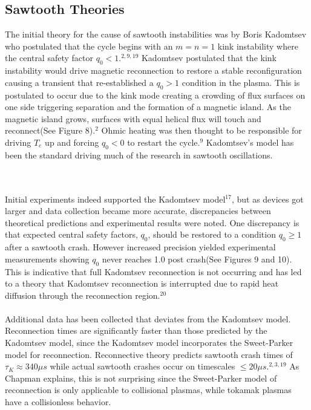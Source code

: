 \documentclass{article}
\begin{document}
\subsection{Sawtooth Theories}
The initial theory for the cause of sawtooth instabilities was by Boris Kadomtsev who postulated that the cycle begins with an $m=n=1$ kink instability where the central safety factor $q_0<1$.$^{2,9,19}$  Kadomtsev postulated that the kink instability would drive magnetic reconnection to restore a stable reconfiguration causing a transient that re-established a $q_0>1$ condition in the plasma.  This is postulated to occur due to the kink mode creating a crowding of flux surfaces on one side triggering separation and the formation of a magnetic island.  As the magnetic island grows, surfaces with equal helical flux will touch and reconnect(See Figure 8).$^{2}$  Ohmic heating was then thought to be responsible for driving $T_e$ up and forcing $q_0<0$ to restart the cycle.$^{9}$  Kadomtsev's model has been the standard driving much of the research in sawtooth oscillations.
\begin{SCfigure}
\centering
{}
\end{SCfigure}
\\\\Initial experiments indeed supported the Kadomtsev model$^{17}$, but as devices got larger and data collection became more accurate, discrepancies between theoretical predictions and experimental results were noted.  One discrepancy is that expected central safety factors, $q_0$, should be restored to a condition $q_0\ge 1$ after a sawtooth crash.  However increased precision yielded experimental measurements showing $q_0$ never reaches 1.0 post crash(See Figures 9 and 10).  This is indicative that full Kadomtsev reconnection is not occurring and has led to a theory that Kadomtsev reconnection is interrupted due to rapid heat diffusion through the reconnection region.$^{20}$
\\\\Additional data has been collected that deviates from the Kadomtsev model.  Reconnection times are significantly faster than those predicted by the Kadomtsev model, since the Kadomtsev model incorporates the Sweet-Parker model for reconnection.  Reconnective theory predicts sawtooth crash times of $\tau_K \approx340 \mu s$ while actual sawtooth crashes occur on timescales $\leq20\mu s$.$^{2,3,19}$  As Chapman explains, this is not surprising since the Sweet-Parker model of reconnection is only applicable to collisional plasmas, while tokamak plasmas have a collisionless behavior.
\end{document}
